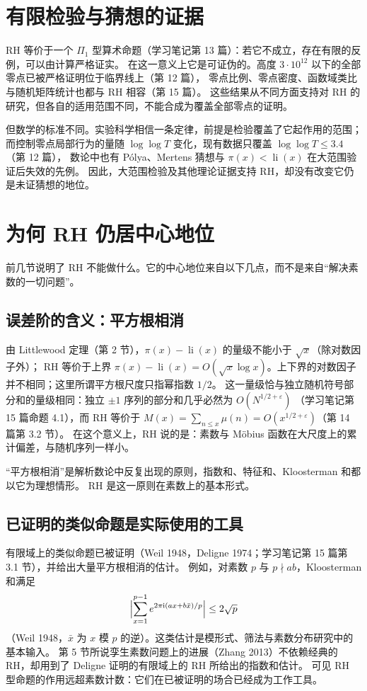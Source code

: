 \documentclass[11pt]{article}
\newcommand{\li}{\operatorname{li}}
\begin{document}
\section{有限检验与猜想的证据}
RH 等价于一个 $\Pi_1$ 型算术命题（学习笔记第 13 篇）：若它不成立，存在有限的反例，可以由计算严格证实。
在这一意义上它是可证伪的。高度 $3\cdot10^{12}$ 以下的全部零点已被严格证明位于临界线上（第 12 篇），
零点比例、零点密度、函数域类比与随机矩阵统计也都与 RH 相容（第 15 篇）。
这些结果从不同方面支持对 RH 的研究，但各自的适用范围不同，不能合成为覆盖全部零点的证明。

但数学的标准不同。实验科学相信一条定律，前提是检验覆盖了它起作用的范围；
而控制零点局部行为的量随 $\log\log T$ 变化，现有数据只覆盖 $\log\log T\le3.4$（第 12 篇），
数论中也有 Pólya、Mertens 猜想与 $\pi(x)<\li(x)$ 在大范围验证后失效的先例。
因此，大范围检验及其他理论证据支持 RH，却没有改变它仍是未证猜想的地位。

\section{为何 RH 仍居中心地位}\label{sec:center}
前几节说明了 RH 不能做什么。它的中心地位来自以下几点，而不是来自“解决素数的一切问题”。

\subsection{误差阶的含义：平方根相消}
由 Littlewood 定理（第 2 节），$\pi(x)-\li(x)$ 的量级不能小于 $\sqrt x$（除对数因子外）；
RH 等价于上界 $\pi(x)-\li(x)=O(\sqrt x\log x)$。上下界的对数因子并不相同；这里所谓平方根尺度只指幂指数 $1/2$。
这一量级恰与独立随机符号部分和的量级相同：独立 $\pm1$ 序列的部分和几乎必然为 $O(N^{1/2+\varepsilon})$
（学习笔记第 15 篇命题 4.1），而 RH 等价于 $M(x)=\sum_{n\le x}\mu(n)=O(x^{1/2+\varepsilon})$（第 14 篇第 3.2 节）。
在这个意义上，RH 说的是：素数与 Möbius 函数在大尺度上的累计偏差，与随机序列一样小。

“平方根相消”是解析数论中反复出现的原则，指数和、特征和、Kloosterman 和都以它为理想情形。
RH 是这一原则在素数上的基本形式。

\subsection{已证明的类似命题是实际使用的工具}
有限域上的类似命题已被证明（Weil 1948，Deligne 1974；学习笔记第 15 篇第 3.1 节），并给出大量平方根相消的估计。
例如，对素数 $p$ 与 $p\nmid ab$，Kloosterman 和满足
\[
 \Bigl|\sum_{x=1}^{p-1}e^{2\pi\mathrm i(ax+b\bar x)/p}\Bigr|\le2\sqrt p
\]
（Weil 1948，$\bar x$ 为 $x$ 模 $p$ 的逆）。这类估计是模形式、筛法与素数分布研究中的基本输入。
第 5 节所说孪生素数问题上的进展（Zhang 2013）不依赖经典的 RH，却用到了 Deligne 证明的有限域上的 RH 所给出的指数和估计。
可见 RH 型命题的作用远超素数计数：它们在已被证明的场合已经成为工作工具。
\end{document}

